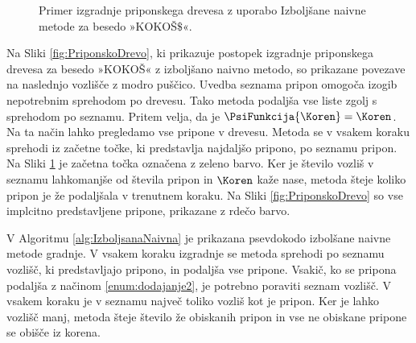 \begin{figure}[tb]
       \caption{Primer izgradnje priponskega drevesa z uporabo Izboljšane naivne metode za besedo »KOKOŠ$\$$«.} 
        \label{fig:IzbolšanaNaivna}
\end{figure}

Na Sliki \ref{fig:PriponskoDrevo}, ki prikazuje postopek izgradnje priponskega drevesa za besedo »KOKOŠ« z izboljšano naivno metodo, so prikazane povezave na naslednjo vozlišče z modro puščico. Uvedba seznama pripon omogoča izogib nepotrebnim sprehodom po drevesu. Tako metoda podaljša vse liste zgolj s sprehodom po seznamu. Pritem velja, da je $\PsiFunkcija{\Koren}=\Koren$. Na ta način lahko pregledamo vse pripone v drevesu. Metoda se v vsakem koraku sprehodi iz začetne točke, ki predstavlja najdaljšo pripono, po seznamu pripon. Na Sliki \ref{fig:IzbolšanaNaivna} je začetna točka označena z zeleno barvo. Ker je število vozliš v seznamu lahkomanjše od števila pripon in $\Koren$ kaže nase, metoda šteje koliko pripon je že podaljšala v trenutnem koraku. Na Sliki \ref{fig:PriponskoDrevo} so vse implcitno predstavljene pripone, prikazane z rdečo barvo.

V Algoritmu \ref{alg:IzboljsanaNaivna} je prikazana psevdokodo izbolšane naivne metode gradnje. V vsakem koraku izgradnje se metoda sprehodi po seznamu vozlišč, ki predstavljajo pripono, in podaljša vse pripone. Vsakič, ko se pripona podaljša z načinom \ref{enum:dodajanje2}, je potrebno poraviti seznam vozlišč. V vsakem koraku je v seznamu največ toliko vozliš kot je pripon. Ker je lahko vozlišč manj, metoda šteje število že obiskanih pripon in vse ne obiskane pripone se obišče iz korena.

